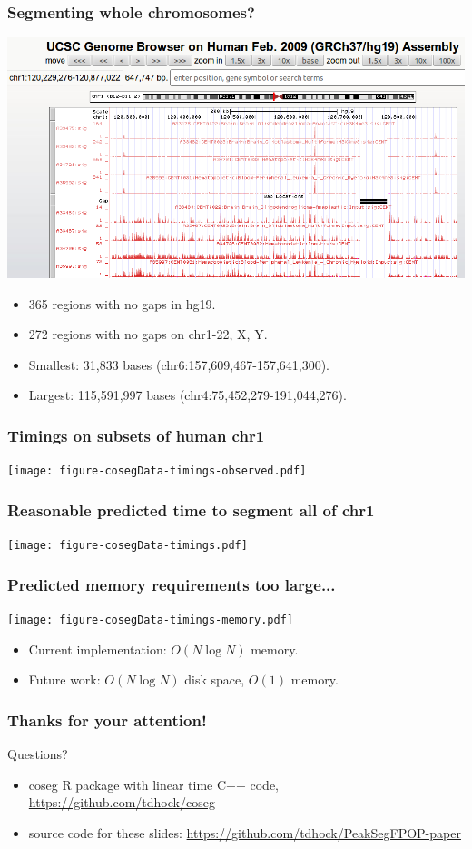 \documentclass{beamer}
\begin{document}
\begin{frame}
  \frametitle{Segmenting whole chromosomes?}
  \includegraphics[width=\textwidth]{screenshot-gap-peaks}
  \begin{itemize}
  \item 365 regions with no gaps in hg19.
  \item 272 regions with no gaps on chr1-22, X, Y.
  \item Smallest: 31,833 bases (chr6:157,609,467-157,641,300).
  \item Largest: 115,591,997 bases (chr4:75,452,279-191,044,276).
  \end{itemize}
\end{frame}


\begin{frame}
  \frametitle{Timings on subsets of human chr1}
  \texttt{[image: figure-cosegData-timings-observed.pdf]}
\end{frame}

\begin{frame}
  \frametitle{Reasonable predicted time to segment all of chr1}
  \texttt{[image: figure-cosegData-timings.pdf]}
\end{frame}

\begin{frame}
  \frametitle{Predicted memory requirements too large...}
  \texttt{[image: figure-cosegData-timings-memory.pdf]}
  \begin{itemize}
  \item Current implementation: $O(N \log N)$ memory.
  \item Future work: $O(N \log N)$ disk space, $O(1)$ memory.
  \end{itemize}
\end{frame}

\begin{frame}
  \frametitle{Thanks for your attention!}

  Questions? 
  \begin{itemize}
  \item 
  coseg R package with linear time C++ code,
  \url{https://github.com/tdhock/coseg}
\item   source code for these slides:
  \url{https://github.com/tdhock/PeakSegFPOP-paper}
  \end{itemize}
\end{frame}
\end{document}
